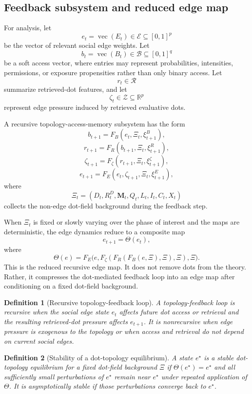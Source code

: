 \documentclass[11pt]{article}
\newtheorem{definition}{Definition}
\theoremstyle{remark}
\begin{document}
\subsection{Feedback subsystem and reduced edge map}\label{feedback-subsystem-reduced-edge-map}

For analysis, let
\[
e_t=\operatorname{vec}(E_t)\in \mathcal E\subseteq [0,1]^p
\]
be the vector of relevant social edge weights. Let
\[
b_t=\operatorname{vec}(B_t)\in \mathcal B\subseteq [0,1]^q
\]
be a soft access vector, where entries may represent probabilities, intensities, permissions, or exposure propensities rather than only binary access. Let
\[
r_t\in\mathcal R
\]
summarize retrieved-dot features, and let
\[
\zeta_t\in\mathcal Z\subseteq \mathbb R^p
\]
represent edge pressure induced by retrieved evaluative dots.

A recursive topology-access-memory subsystem has the form
\[
b_{t+1}=F_B(e_t,\Xi_t,\xi^B_{t+1}),
\]
\[
r_{t+1}=F_R(b_{t+1},\Xi_t,\xi^R_{t+1}),
\]
\[
\zeta_{t+1}=F_\zeta(r_{t+1},\Xi_t,\xi^\zeta_{t+1}),
\]
\[
e_{t+1}=F_E(e_t,\zeta_{t+1},\Xi_t,\xi^E_{t+1}),
\]
where
\[
\Xi_t=(D_t,R_t^D,\mathbf M_t,Q_t,L_t,I_t,C_t,X_t)
\]
collects the non-edge dot-field background during the feedback step.

When \(\Xi_t\) is fixed or slowly varying over the phase of interest and the maps are deterministic, the edge dynamics reduce to a composite map
\[
e_{t+1}=\Theta(e_t),
\]
where
\[
\Theta(e)=F_E\big(e,F_\zeta(F_R(F_B(e,\Xi),\Xi),\Xi),\Xi\big).
\]
This is the reduced recursive edge map. It does not remove dots from the theory. Rather, it compresses the dot-mediated feedback loop into an edge map after conditioning on a fixed dot-field background.

\begin{definition}[Recursive topology-feedback loop]
A topology-feedback loop is recursive when the social edge state \(e_t\) affects future dot access or retrieval and the resulting retrieved-dot pressure affects \(e_{t+1}\). It is nonrecursive when edge pressure is exogenous to the topology or when access and retrieval do not depend on current social edges.
\end{definition}

\begin{definition}[Stability of a dot-topology equilibrium]
A state \(e^\star\) is a stable dot-topology equilibrium for a fixed dot-field background \(\Xi\) if \(\Theta(e^\star)=e^\star\) and all sufficiently small perturbations of \(e^\star\) remain near \(e^\star\) under repeated application of \(\Theta\). It is asymptotically stable if those perturbations converge back to \(e^\star\).
\end{definition}
\end{document}
